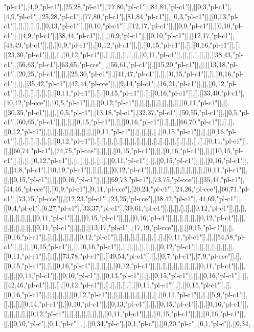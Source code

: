 "pl-c1"],[4,9,"pl-c1"],[25,28,"pl-c1"],[77,80,"pl-c1"],[81,84,"pl-c1"]],[[0,3,"pl-c1"],[4,9,"pl-c1"],[25,28,"pl-c1"],[77,80,"pl-c1"],[81,84,"pl-c1"]],[[0,3,"pl-c1"]],[[0,13,"pl-c1"]],[],[],[],[],[[0,13,"pl-c1"]],[[0,10,"pl-c1"]],[[12,17,"pl-c1"]],[[0,9,"pl-c1"]],[[0,10,"pl-c1"]],[[4,9,"pl-c1"],[38,44,"pl-c1"]],[],[[0,9,"pl-c1"]],[[0,10,"pl-c1"]],[[12,17,"pl-c1"],[43,49,"pl-c1"]],[],[[0,9,"pl-c1"]],[[0,12,"pl-c1"]],[],[[0,15,"pl-c1"]],[],[[0,16,"pl-c1"]],[],[[23,30,"pl-c1"]],[],[],[[0,12,"pl-c1"]],[],[],[],[],[],[],[[0,11,"pl-c1"]],[],[],[],[],[],[[38,43,"pl-c1"],[56,63,"pl-c1"],[63,65,"pl-cce"]],[[56,61,"pl-c1"]],[[15,20,"pl-c1"]],[],[[13,18,"pl-c1"],[20,25,"pl-c1"]],[],[[25,30,"pl-c1"]],[[41,47,"pl-c1"]],[],[[0,15,"pl-c1"]],[],[[0,16,"pl-c1"]],[],[[35,42,"pl-c1"],[42,44,"pl-cce"]],[[9,14,"pl-c1"],[16,21,"pl-c1"]],[],[[0,12,"pl-c1"]],[],[],[],[],[],[],[[0,11,"pl-c1"]],[],[[0,15,"pl-c1"]],[],[[0,16,"pl-c1"]],[],[[33,40,"pl-c1"],[40,42,"pl-cce"]],[[0,5,"pl-c1"]],[],[[0,12,"pl-c1"]],[],[],[],[],[],[],[],[[0,11,"pl-c1"]],[],[[30,35,"pl-c1"]],[],[[0,5,"pl-c1"],[13,18,"pl-c1"],[32,37,"pl-c1"],[50,55,"pl-c1"]],[[0,5,"pl-c1"],[60,65,"pl-c1"]],[],[],[[0,15,"pl-c1"]],[],[[0,16,"pl-c1"]],[],[],[[66,70,"pl-c1"]],[],[],[[0,12,"pl-c1"]],[],[],[],[],[],[],[],[],[[0,11,"pl-c1"]],[],[],[],[],[[0,15,"pl-c1"]],[],[[0,16,"pl-c1"]],[],[],[],[],[],[],[[0,12,"pl-c1"]],[],[],[],[],[],[],[],[],[],[],[],[],[],[],[],[],[],[],[],[[0,11,"pl-c1"]],[],[[66,74,"pl-c1"],[74,75,"pl-cce"]],[],[],[[0,15,"pl-c1"]],[],[[0,16,"pl-c1"]],[],[[10,15,"pl-c1"]],[],[],[[0,12,"pl-c1"]],[],[],[],[],[],[],[[0,11,"pl-c1"]],[],[[0,15,"pl-c1"]],[],[[0,16,"pl-c1"]],[],[[4,8,"pl-c1"],[10,19,"pl-c1"]],[],[],[],[[0,12,"pl-c1"]],[],[],[],[],[],[],[],[],[],[[0,11,"pl-c1"]],[],[[0,15,"pl-c1"]],[],[[0,16,"pl-c1"]],[],[[69,73,"pl-c1"],[73,75,"pl-cce"]],[[35,44,"pl-c1"],[44,46,"pl-cce"]],[[0,9,"pl-c1"],[9,11,"pl-cce"],[20,24,"pl-c1"],[24,26,"pl-cce"],[66,71,"pl-c1"],[73,75,"pl-cce"]],[[12,23,"pl-c1"],[23,25,"pl-cce"],[38,42,"pl-c1"],[44,69,"pl-c1"]],[[0,4,"pl-c1"],[6,27,"pl-c1"],[33,37,"pl-c1"],[39,61,"pl-c1"]],[],[],[],[],[[0,12,"pl-c1"]],[],[],[],[],[],[],[],[[0,11,"pl-c1"]],[],[[0,15,"pl-c1"]],[],[[0,16,"pl-c1"]],[],[],[],[],[[0,12,"pl-c1"]],[],[],[],[],[],[],[[0,11,"pl-c1"]],[],[],[[13,17,"pl-c1"],[17,19,"pl-cce"]],[],[[0,15,"pl-c1"]],[],[[0,16,"pl-c1"]],[],[],[],[],[],[[0,12,"pl-c1"]],[],[],[],[],[],[],[],[],[[0,11,"pl-c1"]],[],[[54,58,"pl-c1"]],[],[],[[0,15,"pl-c1"]],[],[[0,16,"pl-c1"]],[],[],[],[],[],[],[[0,12,"pl-c1"]],[],[],[],[],[],[],[[0,11,"pl-c1"]],[],[],[[73,78,"pl-c1"]],[[49,54,"pl-c1"]],[],[[0,7,"pl-c1"],[7,9,"pl-cce"]],[],[[0,15,"pl-c1"]],[],[[0,16,"pl-c1"]],[],[],[],[[0,12,"pl-c1"]],[],[],[],[],[],[],[],[[0,11,"pl-c1"]],[],[],[],[[0,14,"pl-c1"]],[[0,10,"pl-c1"]],[[0,13,"pl-c1"]],[],[[0,15,"pl-c1"]],[],[[0,16,"pl-c1"]],[],[[42,46,"pl-c1"]],[],[],[[0,12,"pl-c1"]],[],[],[],[],[],[[0,11,"pl-c1"]],[],[[0,15,"pl-c1"]],[],[[0,16,"pl-c1"]],[],[],[],[],[[0,12,"pl-c1"]],[],[],[],[],[],[],[],[],[[0,11,"pl-c1"]],[],[[5,9,"pl-c1"]],[],[],[],[[0,14,"pl-c1"]],[[0,10,"pl-c1"]],[[0,13,"pl-c1"]],[],[[0,15,"pl-c1"]],[],[[0,16,"pl-c1"]],[],[],[],[],[[0,12,"pl-c1"]],[],[],[],[],[],[],[[0,11,"pl-c1"]],[],[[0,15,"pl-c1"]],[],[[0,16,"pl-c1"]],[],[[0,70,"pl-c"],[0,1,"pl-c"]],[],[[0,34,"pl-c"],[0,1,"pl-c"]],[[0,20,"pl-c"],[0,1,"pl-c"]],[[0,34,